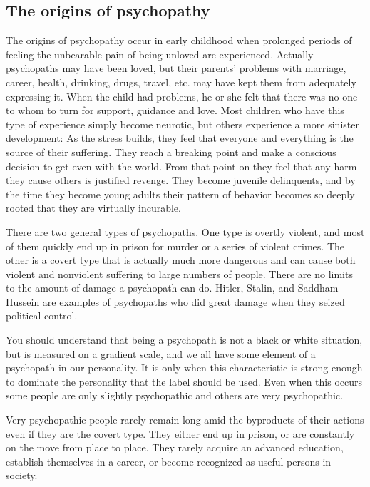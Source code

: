 \documentclass[a5paper,10pt,english]{book}
\begin{document}
\subsection{The origins of psychopathy}
\label{\detokenize{psychopaths:the-origins-of-psychopathy}}
\sphinxAtStartPar
The origins of psychopathy occur in early childhood when prolonged
periods of feeling the unbearable pain of being unloved are experienced.
Actually psychopaths may have been loved, but their parents’ problems
with marriage, career, health, drinking, drugs, travel, etc. may have
kept them from adequately expressing it. When the child had problems, he
or she felt that there was no one to whom to turn for support, guidance
and love. Most children who have this type of experience simply become
neurotic, but others experience a more sinister development: As the
stress builds, they feel that everyone and everything is the source of
their suffering. They reach a breaking point and make a conscious
decision to get even with the world. From that point on they feel that
any harm they cause others is justified revenge. They become juvenile
delinquents, and by the time they become young adults their pattern of
behavior becomes so deeply rooted that they are virtually incurable.

\sphinxAtStartPar
There are two general types of psychopaths. One type is overtly violent,
and most of them quickly end up in prison for murder or a series of
violent crimes. The other is a covert type that is actually much more
dangerous and can cause both violent and nonviolent suffering to large
numbers of people. There are no limits to the amount of damage a
psychopath can do. Hitler, Stalin, and Saddham Hussein are examples of
psychopaths who did great damage when they seized political control.

\sphinxAtStartPar
You should understand that being a psychopath is not a black or white
situation, but is measured on a gradient scale, and we all have some
element of a psychopath in our personality. It is only when this
characteristic is strong enough to dominate the personality that the
label  should be used. Even when this occurs some people
are only slightly psychopathic and others are very psychopathic.

\sphinxAtStartPar
Very psychopathic people rarely remain long amid the byproducts of their
actions even if they are the covert type. They either end up in prison,
or are constantly on the move from place to place. They rarely acquire
an advanced education, establish themselves in a career, or become
recognized as useful persons in society.
\end{document}
